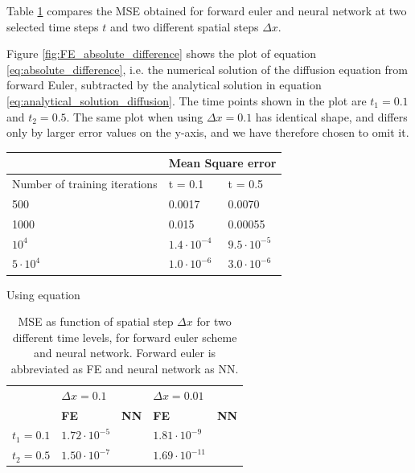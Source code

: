 \documentclass[12pt]{extarticle}
\begin{document}
Table \ref{tab:MSE_compare} compares the MSE obtained for forward euler and neural network at two selected time steps $t$ and two different spatial steps $\Delta x$. 


Figure \ref{fig:FE_absolute_difference} shows the plot of equation \eqref{eq:absolute_difference}, i.e. the numerical solution of the diffusion equation from forward Euler, subtracted by the analytical solution in equation \eqref{eq:analytical_solution_diffusion}. The time points shown in the plot are $t_1=0.1$ and $t_2=0.5$. The same plot when using $\Delta x=0.1$ has identical shape, and differs only by larger error values on the y-axis, and we have therefore chosen to omit it.  


\begin{table}[]
	\begin{tabular}{l|ll|}
		\cline{2-3}
		& \multicolumn{2}{l|}{Mean Square error} \\ \hline
		\multicolumn{1}{|l|}{Number of training iterations} & \multicolumn{1}{l|}{t = 0.1} & t = 0.5 \\ \hline
		\multicolumn{1}{|l|}{500}                           & \multicolumn{1}{l|}{0.0017}  & 0.0070  \\ \hline
		\multicolumn{1}{|l|}{1000}                          & \multicolumn{1}{l|}{0.015}   & 0.00055 \\ \hline
		\multicolumn{1}{|l|}{$10^4$}                          & \multicolumn{1}{l|}{$1.4\cdot 10^{-4}$}  & $9.5\cdot10^{-5}$  \\ \hline
		\multicolumn{1}{|l|}{$5\cdot10^4$}                        & \multicolumn{1}{l|}{$1.0\cdot10^{-6}$}        & $3.0\cdot10^{-6}$        \\ \hline
	\end{tabular}
\end{table}

Using equation 


\begin{table}[h]
	\centering
	\begin{tabular}{l|ll|ll|}
		\cline{2-5}
		& \multicolumn{2}{l|}{\textbf{$\Delta x=0.1$}}           & \multicolumn{2}{l|}{\textbf{$\Delta x=0.01$}}           \\ \cline{2-5} 
		& \multicolumn{1}{l|}{\textbf{FE}}         & \textbf{NN} & \multicolumn{1}{l|}{\textbf{FE}}          & \textbf{NN} \\ \hline
		\multicolumn{1}{|l|}{\textbf{$t_1=0.1$}} & \multicolumn{1}{l|}{$1.72\cdot 10^{-5}$} &             & \multicolumn{1}{l|}{$1.81\cdot 10^{-9}$}  &             \\ \hline
		\multicolumn{1}{|l|}{\textbf{$t_2=0.5$}} & \multicolumn{1}{l|}{$1.50\cdot 10^{-7}$} &             & \multicolumn{1}{l|}{$1.69\cdot 10^{-11}$} &             \\ \hline
	\end{tabular}
\caption{MSE as function of spatial step $\Delta x$ for two different time levels, for forward euler scheme and neural network. Forward euler is abbreviated as FE and neural network as NN.}
\label{tab:MSE_compare}
\end{table}
\end{document}
